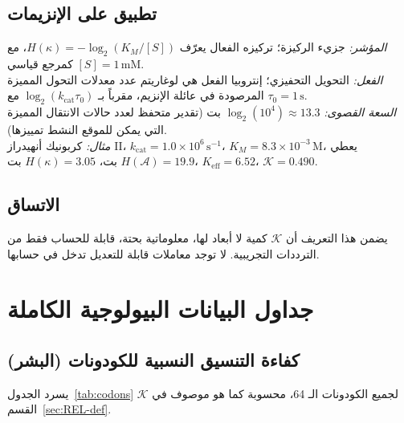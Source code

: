 \documentclass[11pt,a4paper]{article}
\newcommand{\REL}{\mathcal{K}}
\newcommand{\ABS}{K_{\mathrm{eff}}}
\begin{document}
	\subsection{تطبيق على الإنزيمات}
	\textit{المؤشر:} جزيء الركيزة؛ تركيزه الفعال يعرّف \(H(\kappa) = -\log_2(K_M/[S])\)، مع \([S]=1\,\text{mM}\) كمرجع قياسي. \\
	\textit{الفعل:} التحويل التحفيزي؛ إنتروبيا الفعل هي لوغاريتم عدد معدلات التحول المميزة المرصودة في عائلة الإنزيم، مقرباً بـ \(\log_2(k_{\mathrm{cat}}\tau_0)\) مع \(\tau_0=1\,\text{s}\). \\
	\textit{السعة القصوى:} \(\log_2(10^4)\approx13.3\) بت (تقدير متحفظ لعدد حالات الانتقال المميزة التي يمكن للموقع النشط تمييزها). \\
	\textit{مثال:} كربونيك أنهيدراز II، \(k_{\mathrm{cat}}=1.0\times10^6\,\text{s}^{-1}\)، \(K_M=8.3\times10^{-3}\,\text{M}\)، يعطي \(H(\mathcal{A})=19.9\) بت، \(H(\kappa)=3.05\) بت، \(\ABS=6.52\)، \(\REL=0.490\).
	
	\subsection{الاتساق}
	يضمن هذا التعريف أن \(\REL\) كمية لا أبعاد لها، معلوماتية بحتة، قابلة للحساب فقط من الترددات التجريبية. لا توجد معاملات قابلة للتعديل تدخل في حسابها.
	
	\section{جداول البيانات البيولوجية الكاملة}
	\label{sec:tables}
	
	\subsection{كفاءة التنسيق النسبية للكودونات (البشر)}
	\label{sec:codons}
	يسرد الجدول~\ref{tab:codons} \(\REL\) لجميع الكودونات الـ 64، محسوبة كما هو موصوف في القسم~\ref{sec:REL-def}.
	
\end{document}
